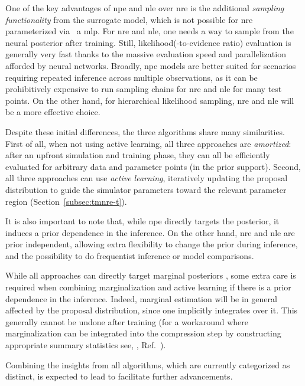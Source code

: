 One of the key advantages of \gls*{npe} and \gls*{nle} over \gls*{nre} is the additional \emph{sampling functionality} from the surrogate model, which is not possible for \gls*{nre} parameterized via \eg\ a \gls*{mlp}. For \gls*{nre} and \gls*{nle}, one needs a way to sample from the neural posterior after training. Still, likelihood(-to-evidence ratio) evaluation is generally very fast thanks to the massive evaluation speed and parallelization afforded by neural networks. Broadly, \gls*{npe} models are better suited for scenarios requiring repeated inference across multiple observations, as it can be prohibitively expensive to run sampling chains for \gls*{nre} and \gls*{nle} for many test points. On the other hand, for hierarchical likelihood sampling, \gls*{nre} and \gls*{nle} will be a more effective choice.

Despite these initial differences, the three algorithms share many similarities. First of all, when not using active learning, all three approaches are \emph{amortized}: after an upfront simulation and training phase, they can all be efficiently evaluated for arbitrary data and parameter points (in the prior support). Second, all three approaches can use \emph{active learning}, iteratively updating the proposal distribution to guide the simulator parameters toward the relevant parameter region (Section~\ref{subsec:tmnre-t}).

It is also important to note that, while \gls*{npe} directly targets the posterior, it induces a prior dependence in the inference. On the other hand, \gls*{nre} and \gls*{nle} are prior independent, allowing extra flexibility to change the prior during inference, and the possibility to do frequentist inference or model comparisons. 
	
While all approaches can directly target marginal posteriors \cite{Miller:2020hua, Miller:2021aa, Alsing:2019dvb, Jeffrey:2020itg}, some extra care is required when combining marginalization and active learning if there is a prior dependence in the inference. Indeed, marginal estimation will be in general affected by the proposal distribution, since one implicitly integrates over it. This generally cannot be undone after training (for a workaround where marginalization can be integrated into the compression step by constructing appropriate summary statistics see, \eg, Ref.~\cite{Alsing:2019dvb}). 

Combining the insights from all algorithms, which are currently categorized as distinct, is expected to lead to facilitate further advancements.


